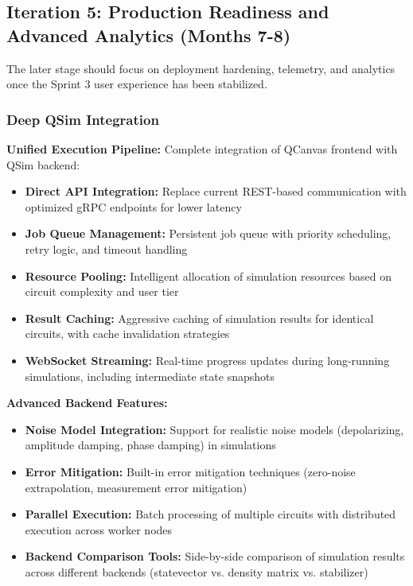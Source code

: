 \subsection{Iteration 5: Production Readiness and Advanced Analytics (Months 7-8)}

The later stage should focus on deployment hardening, telemetry, and analytics once the Sprint 3 user experience has been stabilized.

\subsubsection{Deep QSim Integration}

\textbf{Unified Execution Pipeline:} Complete integration of QCanvas frontend with QSim backend:
\begin{itemize}
    \item \textbf{Direct API Integration:} Replace current REST-based communication with optimized gRPC endpoints for lower latency
    \item \textbf{Job Queue Management:} Persistent job queue with priority scheduling, retry logic, and timeout handling
    \item \textbf{Resource Pooling:} Intelligent allocation of simulation resources based on circuit complexity and user tier
    \item \textbf{Result Caching:} Aggressive caching of simulation results for identical circuits, with cache invalidation strategies
    \item \textbf{WebSocket Streaming:} Real-time progress updates during long-running simulations, including intermediate state snapshots
\end{itemize}

\textbf{Advanced Backend Features:}
\begin{itemize}
    \item \textbf{Noise Model Integration:} Support for realistic noise models (depolarizing, amplitude damping, phase damping) in simulations
    \item \textbf{Error Mitigation:} Built-in error mitigation techniques (zero-noise extrapolation, measurement error mitigation)
    \item \textbf{Parallel Execution:} Batch processing of multiple circuits with distributed execution across worker nodes
    \item \textbf{Backend Comparison Tools:} Side-by-side comparison of simulation results across different backends (statevector vs. density matrix vs. stabilizer)
\end{itemize}

